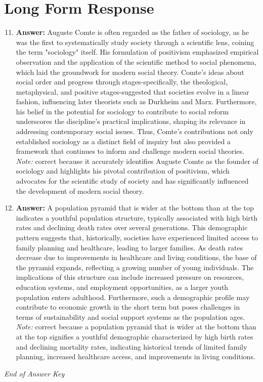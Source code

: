\documentclass[12pt]{article}
\begin{document}
\section*{Long Form Response}
\begin{enumerate}[label=\arabic*.]
\setcounter{enumi}{10}
\item \textbf{Answer:} Auguste Comte is often regarded as the father of sociology, as he was the first to systematically study society through a scientific lens, coining the term "sociology" itself. His formulation of positivism emphasized empirical observation and the application of the scientific method to social phenomena, which laid the groundwork for modern social theory. Comte's ideas about social order and progress through stages-specifically, the theological, metaphysical, and positive stages-suggested that societies evolve in a linear fashion, influencing later theorists such as Durkheim and Marx. Furthermore, his belief in the potential for sociology to contribute to social reform underscores the discipline's practical implications, shaping its relevance in addressing contemporary social issues. Thus, Comte's contributions not only established sociology as a distinct field of inquiry but also provided a framework that continues to inform and challenge modern social theories.
\\ \textit{Note:} correct because it accurately identifies Auguste Comte as the founder of sociology and highlights his pivotal contribution of positivism, which advocates for the scientific study of society and has significantly influenced the development of modern social theory.
\item \textbf{Answer:} A population pyramid that is wider at the bottom than at the top indicates a youthful population structure, typically associated with high birth rates and declining death rates over several generations. This demographic pattern suggests that, historically, societies have experienced limited access to family planning and healthcare, leading to larger families. As death rates decrease due to improvements in healthcare and living conditions, the base of the pyramid expands, reflecting a growing number of young individuals. The implications of this structure can include increased pressure on resources, education systems, and employment opportunities, as a larger youth population enters adulthood. Furthermore, such a demographic profile may contribute to economic growth in the short term but poses challenges in terms of sustainability and social support systems as the population ages.
\\ \textit{Note:} correct because a population pyramid that is wider at the bottom than at the top signifies a youthful demographic characterized by high birth rates and declining mortality rates, indicating historical trends of limited family planning, increased healthcare access, and improvements in living conditions.
\end{enumerate}

\vfill
\noindent\textit{End of Answer Key}
\end{document}
